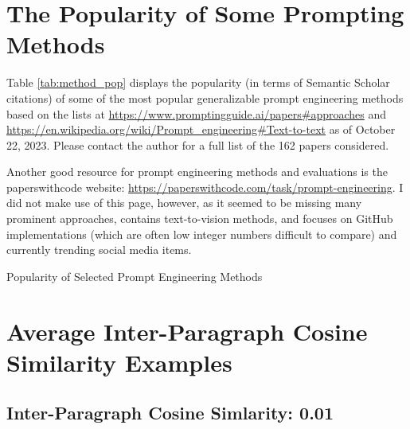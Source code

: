 \documentclass[11pt]{article}
\begin{document}
\clearpage
\newpage

\onecolumn
\setlength{\parindent}{0cm}
\setlength\parskip{1em plus 0.1em minus 0.2em}
\appendix

\section{The Popularity of Some Prompting Methods}
\label{sec:popularity}

Table \ref{tab:method_pop} displays the popularity (in terms of Semantic Scholar citations) of some of the most popular generalizable prompt engineering methods based on the lists at \url{https://www.promptingguide.ai/papers#approaches} and \url{https://en.wikipedia.org/wiki/Prompt_engineering#Text-to-text} as of October 22, 2023. Please contact the author for a full list of the 162 papers considered.

Another good resource for prompt engineering methods and evaluations is the paperswithcode website: \url{https://paperswithcode.com/task/prompt-engineering}. I did not make use of this page, however, as it seemed to be missing many prominent approaches, contains text-to-vision methods, and focuses on GitHub implementations (which are often low integer numbers difficult to compare) and currently trending social media items.

\begin{landscape}

  \begin{centering}

    \begin{table}[h]
      \caption{Popularity of Selected Prompt Engineering Methods}
      \small
      
      \label{tab:method_pop}
    \end{table}

  \end{centering}

\end{landscape}

\clearpage
\newpage

\section{Average Inter-Paragraph Cosine Similarity Examples}
\label{sec:avg_inter_pragraph_cosine_sim_ex}

\subsection*{Inter-Paragraph Cosine Simlarity: 0.01} %
\end{document}
